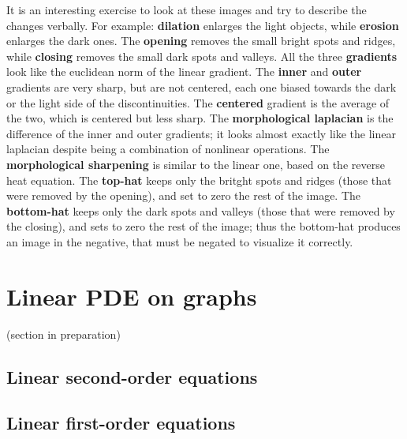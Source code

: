 It is an interesting exercise to look at these images and try to describe the
changes verbally.  For example: {\bf dilation} enlarges the light objects,
while {\bf erosion} enlarges the dark ones.  The {\bf opening} removes the
small bright spots and ridges, while {\bf closing} removes the small dark
spots and valleys.  All the three {\bf gradients} look like the euclidean
norm of the linear gradient.  The {\bf inner} and {\bf outer} gradients are
very sharp, but are not centered, each one biased towards the dark or the
light side of the discontinuities.  The {\bf centered} gradient is the
average of the two, which is centered but less sharp.  The {\bf morphological
laplacian} is the difference of the inner and outer gradients; it looks
almost exactly like the linear laplacian despite being a combination of
nonlinear operations.  The {\bf morphological sharpening} is similar to the
linear one, based on the reverse heat equation.  The {\bf top-hat} keeps only
the britght spots and ridges (those that were removed by the opening), and
set to zero the rest of the image.  The {\bf bottom-hat} keeps only the dark
spots and valleys (those that were removed by the closing), and sets to zero
the rest of the image; thus the bottom-hat produces an image in the negative,
that must be negated to visualize it correctly.


\section{Linear PDE on graphs}

(section in preparation)

\subsection{Linear second-order equations}

\subsection{Linear first-order equations}


